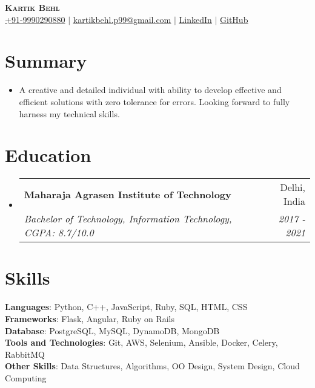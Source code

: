 \documentclass[letterpaper,11pt]{article}
\makeatletter
\newcommand{\resumeItem}[1]{
  \item\small{
    {#1 \vspace{-2pt}}
  }
}
\newcommand{\resumeSubheading}[4]{
  \vspace{-2pt}\item
    \begin{tabular*}{0.97\textwidth}[t]{l@{\extracolsep{\fill}}r}
      \textbf{#1} & #2 \\
      \textit{\small#3} & \textit{\small #4} \\
    \end{tabular*}\vspace{-7pt}
}
\newcommand{\resumeSubHeadingListStart}{\begin{itemize}[leftmargin=0.15in, label={}]}
\newcommand{\resumeSubHeadingListEnd}{\end{itemize}}
\makeatother
\begin{document}

\begin{center}
    \textbf{\Huge \scshape Kartik Behl} \\ \vspace{1pt}
    \small \href{tel:9990290880}{+91-9990290880} $|$ \href{mailto:kartikbehl.p99@gmail.com}{\underline{kartikbehl.p99@gmail.com}} $|$ 
    \href{https://www.linkedin.com/in/kartik-b-b46a3484/}{\underline{LinkedIn}} $|$
    \href{https://github.com/kartikbehl99}{\underline{GitHub}}
\end{center}


\section{Summary}
\resumeSubHeadingListStart
\resumeItem{A creative and detailed individual with ability to develop effective and efficient solutions with zero tolerance for errors. Looking forward to fully harness my technical skills.}
\resumeSubHeadingListEnd


\section{Education}
  \resumeSubHeadingListStart
    \resumeSubheading
      {Maharaja Agrasen Institute of Technology}{Delhi, India}
      {Bachelor of Technology, Information Technology, CGPA: 8.7/10.0}{2017 - 2021}
  \resumeSubHeadingListEnd


\section{Skills}
 \begin{itemize}[leftmargin=0.15in, label={}]
    \small{\item{
     \textbf{Languages}{: Python, C++, JavaScript, Ruby, SQL, HTML, CSS} \\
     \textbf{Frameworks}{: Flask, Angular, Ruby on Rails} \\
     \textbf{Database}{: PostgreSQL, MySQL, DynamoDB, MongoDB} \\
     \textbf{Tools and Technologies}{: Git, AWS, Selenium, Ansible, Docker, Celery, RabbitMQ} \\
     \textbf{Other Skills}{: Data Structures, Algorithms, OO Design, System Design, Cloud Computing} \\
    }}
 \end{itemize}
\end{document}
